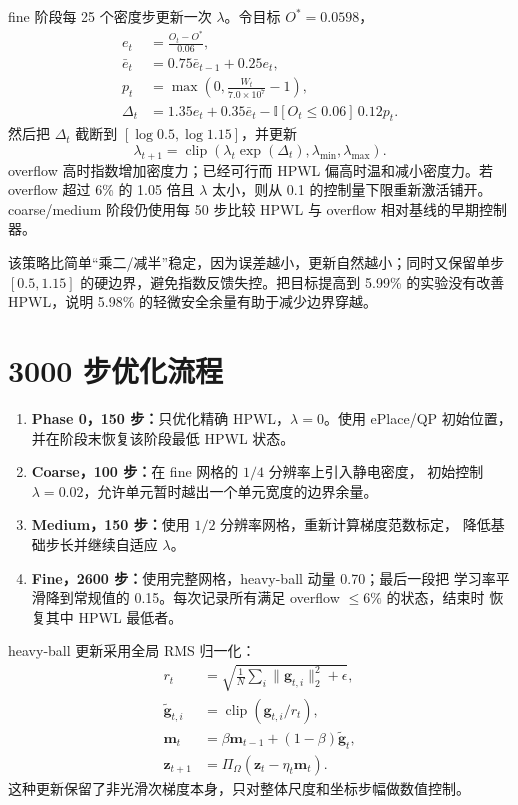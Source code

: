 \documentclass[UTF8,fontset=windows,a4paper,11pt]{ctexart}
\begin{document}
fine 阶段每 25 个密度步更新一次 $\lambda$。令目标 $O^*=0.0598$，
\begin{align}
 e_t &= \frac{O_t-O^*}{0.06},\\
 \bar e_t &=0.75\bar e_{t-1}+0.25e_t,\\
 p_t &=\max\left(0,\frac{W_t}{7.0\times10^7}-1\right),\\
 \Delta_t &=1.35e_t+0.35\bar e_t-
  \mathbb I[O_t\leq0.06]\,0.12p_t.
\end{align}
然后把 $\Delta_t$ 截断到 $[\log 0.5,\log 1.15]$，并更新
\begin{equation}
 \lambda_{t+1}=\operatorname{clip}
 \left(\lambda_t\exp(\Delta_t),\lambda_{\min},\lambda_{\max}\right).
\end{equation}
overflow 高时指数增加密度力；已经可行而 HPWL 偏高时温和减小密度力。若 overflow
超过 6\% 的 1.05 倍且 $\lambda$ 太小，则从 0.1 的控制量下限重新激活铺开。
coarse/medium 阶段仍使用每 50 步比较 HPWL 与 overflow 相对基线的早期控制器。

该策略比简单``乘二/减半''稳定，因为误差越小，更新自然越小；同时又保留单步
$[0.5,1.15]$ 的硬边界，避免指数反馈失控。把目标提高到 5.99\% 的实验没有改善
HPWL，说明 5.98\% 的轻微安全余量有助于减少边界穿越。

\section{3000 步优化流程}

\begin{enumerate}
  \item \textbf{Phase 0，150 步：}只优化精确 HPWL，$\lambda=0$。使用 ePlace/QP
  初始位置，并在阶段末恢复该阶段最低 HPWL 状态。
  \item \textbf{Coarse，100 步：}在 fine 网格的 $1/4$ 分辨率上引入静电密度，
  初始控制 $\lambda=0.02$，允许单元暂时越出一个单元宽度的边界余量。
  \item \textbf{Medium，150 步：}使用 $1/2$ 分辨率网格，重新计算梯度范数标定，
  降低基础步长并继续自适应 $\lambda$。
  \item \textbf{Fine，2600 步：}使用完整网格，heavy-ball 动量 0.70；最后一段把
  学习率平滑降到常规值的 0.15。每次记录所有满足 overflow $\leq6\%$ 的状态，结束时
  恢复其中 HPWL 最低者。
\end{enumerate}

heavy-ball 更新采用全局 RMS 归一化：
\begin{align}
 r_t&=\sqrt{\frac{1}{N}\sum_i\|\bm g_{t,i}\|_2^2+\epsilon},\\
 \widetilde{\bm g}_{t,i}&=\operatorname{clip}(\bm g_{t,i}/r_t),\\
 \bm m_t&=\beta\bm m_{t-1}+(1-\beta)\widetilde{\bm g}_t,\\
 \bm z_{t+1}&=\Pi_{\Omega}(\bm z_t-\eta_t\bm m_t).
\end{align}
这种更新保留了非光滑次梯度本身，只对整体尺度和坐标步幅做数值控制。
\end{document}
